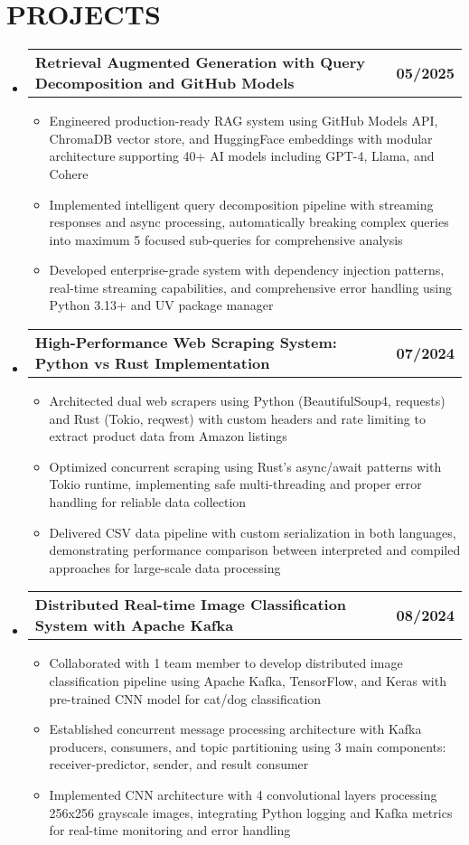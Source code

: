 \documentclass[letterpaper,11pt]{article}
\makeatletter
\def\spaceBelowEdSec{-8pt}
\def\spaceBelowTechSecContent{-8pt}
\def\spaceBetweenResumeItems{-4pt}
\def\spaceBetweenSubheadings{-1pt}
\def\spaceAfterProjectHeading{-7pt}
\newcommand{\resumeItem}[1]{
  \item\small{
    {#1 \vspace{\spaceBetweenResumeItems}}
  }
}
\newcommand{\resumeProjectHeading}[2]{
    \vspace{\spaceBetweenSubheadings}\item
    \begin{tabular*}{1.001\textwidth}{l@{\extracolsep{\fill}}r}
      \small#1 & \textbf{\small #2}\\
    \end{tabular*}\vspace{\spaceAfterProjectHeading}
}
\newcommand{\resumeSubHeadingListStart}{\begin{itemize}[leftmargin=0.0in, label={}]}
\newcommand{\resumeSubHeadingListEnd}{\end{itemize}\vspace{\spaceBelowEdSec}}
\newcommand{\resumeItemListStart}{\begin{itemize}[leftmargin=0.1in]}
\newcommand{\resumeItemListEnd}{\end{itemize}\vspace{\spaceBelowTechSecContent}}
\makeatother
\begin{document}
\section{{PROJECTS}}
\resumeSubHeadingListStart
\resumeProjectHeading
{\textbf{Retrieval Augmented Generation with Query Decomposition and GitHub Models }}{05/2025}
\resumeItemListStart
\resumeItem{Engineered production-ready RAG system using GitHub Models API, ChromaDB vector store, and HuggingFace embeddings with modular architecture supporting 40+ AI models including GPT-4, Llama, and Cohere}
\resumeItem{Implemented intelligent query decomposition pipeline with streaming responses and async processing, automatically breaking complex queries into maximum 5 focused sub-queries for comprehensive analysis}
\resumeItem{Developed enterprise-grade system with dependency injection patterns, real-time streaming capabilities, and comprehensive error handling using Python 3.13+ and UV package manager}
\resumeItemListEnd
\vspace{-6pt}
\resumeProjectHeading
{\textbf{High-Performance Web Scraping System: Python vs Rust Implementation}}{07/2024}
\resumeItemListStart
\resumeItem{Architected dual web scrapers using Python (BeautifulSoup4, requests) and Rust (Tokio, reqwest) with custom headers and rate limiting to extract product data from Amazon listings}
\resumeItem{Optimized concurrent scraping using Rust's async/await patterns with Tokio runtime, implementing safe multi-threading and proper error handling for reliable data collection}
\resumeItem{Delivered CSV data pipeline with custom serialization in both languages, demonstrating performance comparison between interpreted and compiled approaches for large-scale data processing}
\resumeItemListEnd
\vspace{-6pt}
\resumeProjectHeading
{\textbf{Distributed Real-time Image Classification System with Apache Kafka}}{08/2024}
\resumeItemListStart
\resumeItem{Collaborated with 1 team member to develop distributed image classification pipeline using Apache Kafka, TensorFlow, and Keras with pre-trained CNN model for cat/dog classification}
\resumeItem{Established concurrent message processing architecture with Kafka producers, consumers, and topic partitioning using 3 main components: receiver-predictor, sender, and result consumer}
\resumeItem{Implemented CNN architecture with 4 convolutional layers processing 256x256 grayscale images, integrating Python logging and Kafka metrics for real-time monitoring and error handling}
\resumeItemListEnd

\resumeSubHeadingListEnd
\end{document}
